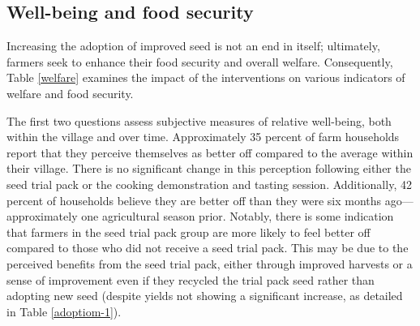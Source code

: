 \documentclass[english]{article}\usepackage[]{graphicx}\usepackage[]{xcolor}
\begin{document}
\subsection{Well-being and food security}

Increasing the adoption of improved seed is not an end in itself;
ultimately, farmers seek to enhance their food security and overall
welfare. Consequently, Table \ref{welfare} examines the impact of
the interventions on various indicators of welfare and food security.

The first two questions assess subjective measures of relative well-being,
both within the village and over time. Approximately 35 percent of
farm households report that they perceive themselves as better off
compared to the average within their village. There is no significant
change in this perception following either the seed trial pack or
the cooking demonstration and tasting session. Additionally, 42 percent
of households believe they are better off than they were six months
ago---approximately one agricultural season prior. Notably, there
is some indication that farmers in the seed trial pack group are more
likely to feel better off compared to those who did not receive a
seed trial pack. This may be due to the perceived benefits from the
seed trial pack, either through improved harvests or a sense of improvement
even if they recycled the trial pack seed rather than adopting new
seed (despite yields not showing a significant increase, as detailed
in Table \ref{adoptiom-1}).
\end{document}
